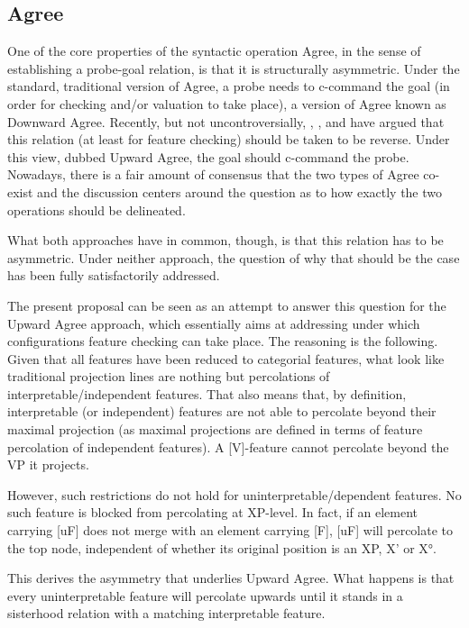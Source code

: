 \documentclass[output=paper
,modfonts
,nonflat]{langsci/langscibook}
\begin{document}
\subsection{Agree}
One of the core properties of the syntactic operation Agree, in the sense of establishing a probe-goal relation, is that it is structurally asymmetric. Under the standard, traditional version of Agree, a probe needs to c-command the goal (in order for checking and/or valuation to take place), a version of Agree known as Downward Agree. Recently, but not uncontroversially, \citet{Wurmbrand2012a, Wurmbrand2012}, \citet{Zeijlstra2012}, and \citet{Bjorkman_ZeijlstraTA} have argued that this relation (at least for feature checking) should be taken to be reverse. Under this view, dubbed Upward Agree, the goal should c-command the probe. Nowadays, there is a fair amount of consensus that the two types of Agree co-exist and the discussion centers around the question as to how exactly the two operations should be delineated.

What both approaches have in common, though, is that this relation has to be asymmetric. Under neither approach, the question of why that should be the case has been fully satisfactorily addressed. 

The present proposal can be seen as an attempt to answer this question for the Upward Agree approach, which essentially aims at addressing under which configurations feature checking can take place. The reasoning is the following. Given that all features have been reduced to categorial features, what look like traditional projection lines are nothing but percolations of interpretable\slash independent features. That also means that, by definition, interpretable (or independent) features are not able to percolate beyond their maximal projection (as maximal projections are defined in terms of feature percolation of independent features). A [V]-feature cannot percolate beyond the VP it projects.

However, such restrictions do not hold for uninterpretable\slash dependent features. No such feature is blocked from percolating at XP-level. In fact, if an element carrying [uF] does not merge with an element carrying [F], [uF] will percolate to the top node, independent of whether its original position is an XP, X’ or X°. 

This derives the asymmetry that underlies Upward Agree. What happens is that every uninterpretable feature will percolate upwards until it stands in a sisterhood relation with a matching interpretable feature. 
\end{document}
